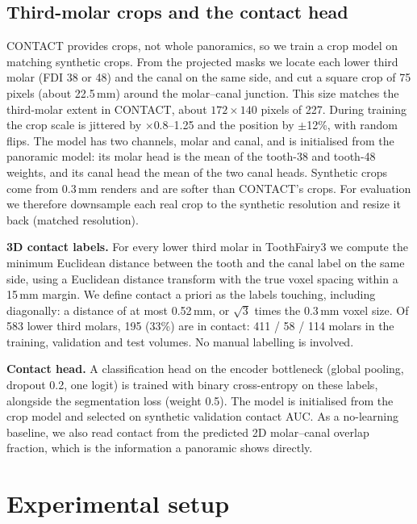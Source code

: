 \documentclass[preprint,12pt]{elsarticle}
\begin{document}
\subsection{Third-molar crops and the contact head}
CONTACT provides crops, not whole panoramics, so we train a crop model on matching synthetic crops. From the projected
masks we locate each lower third molar (FDI 38 or 48) and the canal on the same side, and cut a square crop of 75 pixels
(about 22.5\,mm) around the molar--canal junction. This size matches the third-molar extent in CONTACT, about
$172\times140$ pixels of 227. During training the crop scale is jittered by $\times$0.8--1.25 and the position by
$\pm$12\%, with random flips. The model has two channels, molar and canal, and is initialised from the panoramic model:
its molar head is the mean of the tooth-38 and tooth-48 weights, and its canal head the mean of the two canal heads.
Synthetic crops come from 0.3\,mm renders and are softer than CONTACT's crops. For evaluation we therefore downsample each
real crop to the synthetic resolution and resize it back (matched resolution).

\textbf{3D contact labels.} For every lower third molar in ToothFairy3 we compute the minimum Euclidean distance between
the tooth and the canal label on the same side, using a Euclidean distance transform with the true voxel spacing within
a 15\,mm margin. We define contact a priori as the labels touching, including diagonally: a distance of at most
0.52\,mm, or $\sqrt{3}$ times the 0.3\,mm voxel size. Of 583 lower third molars, 195 (33\%) are in contact: 411 / 58 /
114 molars in the training, validation and test volumes. No manual labelling is involved.

\textbf{Contact head.} A classification head on the encoder bottleneck (global pooling, dropout 0.2, one logit) is
trained with binary cross-entropy on these labels, alongside the segmentation loss (weight 0.5). The model is initialised
from the crop model and selected on synthetic validation contact AUC. As a no-learning baseline, we also read contact
from the predicted 2D molar--canal overlap fraction, which is the information a panoramic shows directly.

\section{Experimental setup}
\label{sec:setup}
\end{document}
